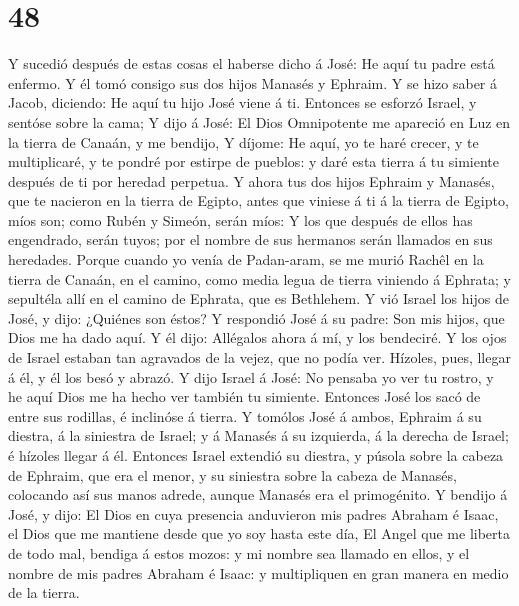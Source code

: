 \hypertarget{section-47}{%
\section{48}\label{section-47}}

 Y sucedió después de estas cosas el haberse dicho á José:
He aquí tu padre está enfermo. Y él tomó consigo sus dos hijos Manasés y
Ephraim.  Y se hizo saber á Jacob, diciendo: He aquí tu hijo
José viene á ti. Entonces se esforzó Israel, y sentóse sobre la cama;
 Y dijo á José: El Dios Omnipotente me apareció en Luz en la
tierra de Canaán, y me bendijo,  Y díjome: He aquí, yo te
haré crecer, y te multiplicaré, y te pondré por estirpe de pueblos: y
daré esta tierra á tu simiente después de ti por heredad perpetua.
 Y ahora tus dos hijos Ephraim y Manasés, que te nacieron en
la tierra de Egipto, antes que viniese á ti á la tierra de Egipto, míos
son; como Rubén y Simeón, serán míos:  Y los que después de
ellos has engendrado, serán tuyos; por el nombre de sus hermanos serán
llamados en sus heredades.  Porque cuando yo venía de
Padan-aram, se me murió Rachêl en la tierra de Canaán, en el camino,
como media legua de tierra viniendo á Ephrata; y sepultéla allí en el
camino de Ephrata, que es Bethlehem.  Y vió Israel los hijos
de José, y dijo: ¿Quiénes son éstos?  Y respondió José á su
padre: Son mis hijos, que Dios me ha dado aquí. Y él dijo: Allégalos
ahora á mí, y los bendeciré.  Y los ojos de Israel estaban
tan agravados de la vejez, que no podía ver. Hízoles, pues, llegar á él,
y él los besó y abrazó.  Y dijo Israel á José: No pensaba
yo ver tu rostro, y he aquí Dios me ha hecho ver también tu simiente.
 Entonces José los sacó de entre sus rodillas, é inclinóse
á tierra.  Y tomólos José á ambos, Ephraim á su diestra, á
la siniestra de Israel; y á Manasés á su izquierda, á la derecha de
Israel; é hízoles llegar á él.  Entonces Israel extendió su
diestra, y púsola sobre la cabeza de Ephraim, que era el menor, y su
siniestra sobre la cabeza de Manasés, colocando así sus manos adrede,
aunque Manasés era el primogénito.  Y bendijo á José, y
dijo: El Dios en cuya presencia anduvieron mis padres Abraham é Isaac,
el Dios que me mantiene desde que yo soy hasta este día, 
El Angel que me liberta de todo mal, bendiga á estos mozos: y mi nombre
sea llamado en ellos, y el nombre de mis padres Abraham é Isaac: y
multipliquen en gran manera en medio de la tierra. 

